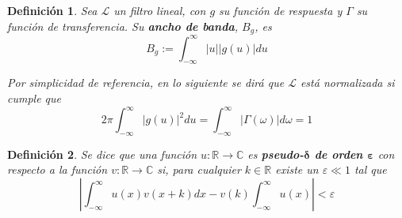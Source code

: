\documentclass[12pt,letterpaper]{book}
\newtheorem{definicion}{Definición}[chapter]
\newcommand{\R}{\mathbb{R}}
\newcommand{\C}{\mathbb{C}}
\newcommand{\intR}{\int_{-\infty}^{\infty}}
\newcommand{\ef}{\mathbf{F}}
\newcommand{\abso}[1]{\left| #1 \right|}
\newcommand{\xt}{$\{X(t)\}_{t\in \mathcal{T}}$ }
\begin{document}

\begin{definicion}
Sea $\mathcal{L}$ un filtro lineal, con $g$ su función de respuesta y $\Gamma$ su función de transferencia. Su \textbf{ancho de banda}, $B_g$, es
\begin{equation}
B_g := \intR \abso{u} \abso{g(u)} du
\end{equation}

Por simplicidad de referencia, en lo siguiente se dirá que $\mathcal{L}$ está normalizada si cumple que
\begin{equation}
2 \pi \intR \abso{g(u)}^{2} du = \intR \abso{\Gamma(\omega)} d\omega = 1
\label{s6:norm_g}
\end{equation}
\end{definicion}

\begin{definicion}
Se dice que una función $u : \R \rightarrow \C$ es \textbf{pseudo-$\boldsymbol{\delta}$ de orden $\boldsymbol{\varepsilon}$} con respecto a la función $v : \R \rightarrow \C$ si, para cualquier $k\in \R$ existe un $\varepsilon \ll 1$ tal que 
\begin{equation}
\abso{\intR u(x) v(x+k) dx  -  v(k)\intR u(x)} < \varepsilon
\end{equation}
\end{definicion}
\end{document}
